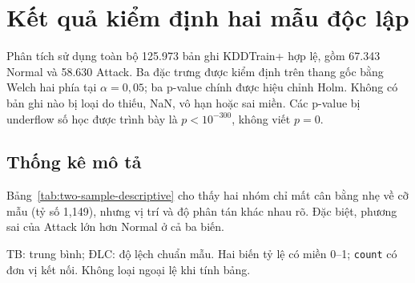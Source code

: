 \section{Kết quả kiểm định hai mẫu độc lập}
\label{sec:two-sample-results}

Phân tích sử dụng toàn bộ 125.973 bản ghi KDDTrain+ hợp lệ, gồm 67.343 Normal và
58.630 Attack. Ba đặc trưng được kiểm định trên thang gốc bằng Welch hai phía tại
$\alpha=0{,}05$; ba p-value chính được hiệu chỉnh Holm. Không có bản ghi nào bị loại
do thiếu, NaN, vô hạn hoặc sai miền. Các p-value bị underflow số học được trình bày
là $p<10^{-300}$, không viết $p=0$.

\subsection{Thống kê mô tả}
\label{subsec:two-sample-descriptive}

Bảng~\ref{tab:two-sample-descriptive} cho thấy hai nhóm chỉ mất cân bằng nhẹ về cỡ
mẫu (tỷ số 1,149), nhưng vị trí và độ phân tán khác nhau rõ. Đặc biệt, phương sai của
Attack lớn hơn Normal ở cả ba biến.

\begin{table}[H]
\centering
\caption{Thống kê mô tả ba đặc trưng theo nhãn trên KDDTrain+}
\label{tab:two-sample-descriptive}
\scriptsize
\setlength{\tabcolsep}{2.7pt}
\par\smallskip
\footnotesize TB: trung bình; ĐLC: độ lệch chuẩn mẫu. Hai biến tỷ lệ có miền 0--1;
\texttt{count} có đơn vị kết nối. Không loại ngoại lệ khi tính bảng.
\end{table}

